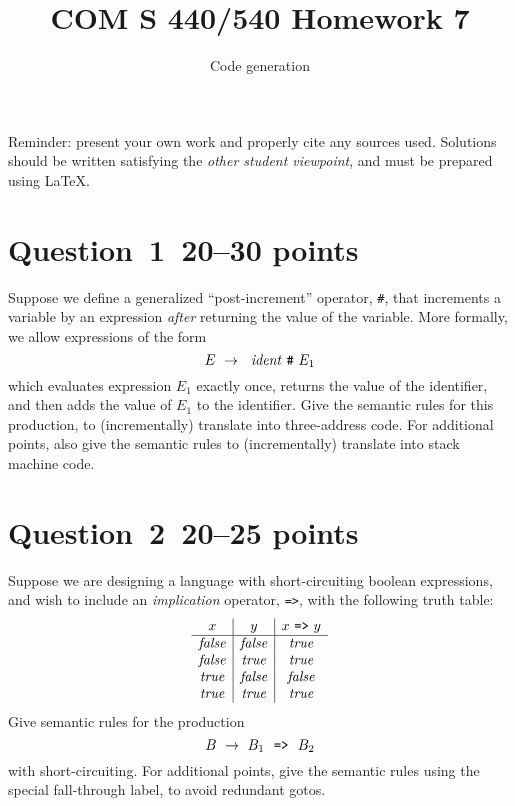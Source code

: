 \documentclass[10pt]{article}
\title{COM S 440/540 Homework 7}
\date{}
\author{Code generation}
\begin{document}
\maketitle

\noindent
Reminder: present your own work and properly cite any sources used.
Solutions should be written satisfying the \emph{other student viewpoint},
and must be prepared using \LaTeX.
\renewcommand{\thepage}{~}
\section*{Question~1~\hfill 20--30 points}

Suppose we define a generalized ``post-increment'' operator, \verb|#|,
that increments a variable by an expression \emph{after} returning
the value of the variable.
More formally, we allow expressions of the form
\[
  E ~\rightarrow~~\mathit{ident} ~ \verb|#| ~ E_1
\]
which evaluates expression $E_1$ exactly once,
returns the value of the identifier,
and then adds the value of $E_1$ to the identifier.
Give the semantic rules for this production,
to (incrementally) translate into three-address code.
For additional points, also give the semantic rules
to (incrementally) translate into stack machine code.


\section*{Question~2~\hfill 20--25 points}

Suppose we are designing a language with short-circuiting
boolean expressions,
and wish to include an \emph{implication} operator, \verb|=>|,
with the following truth table:
\[
  \begin{array}{c|c|c}
    x & y & x ~\verb|=>|~ y
  \\ \hline
    \mathit{false} & \mathit{false} & \mathit{true}
  \\
    \mathit{false} & \mathit{true} & \mathit{true}
  \\
    \mathit{true} & \mathit{false} & \mathit{false}
  \\
    \mathit{true} & \mathit{true} & \mathit{true}
  \end{array}
\]
Give semantic rules
for the production
\[
  B ~\rightarrow~ B_1 ~~\verb|=>|~~ B_2
\]
with short-circuiting.
For additional points,
give the semantic rules using the special fall-through label,
to avoid redundant gotos.
\end{document}
